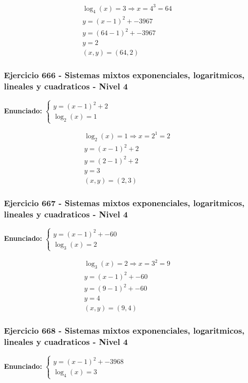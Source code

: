 \documentclass[12pt,a4paper]{article}
\begin{document}
\[
\begin{aligned}
\log_{4}\left(x\right)=3\Rightarrow x=4^{3}=64\\
y=(x-1)^2+-3967\\
y=(64-1)^2+-3967\\
y=2\\
\boxed{(x,y)=(64,2)}
\end{aligned}
\]


\subsubsection*{Ejercicio 666 - Sistemas mixtos exponenciales, logaritmicos, lineales y cuadraticos - Nivel 4}
\textbf{Enunciado:} \(\begin{cases} y=(x-1)^2+2\\ \log_{2}\left(x\right)=1\end{cases}\)

\[
\begin{aligned}
\log_{2}\left(x\right)=1\Rightarrow x=2^{1}=2\\
y=(x-1)^2+2\\
y=(2-1)^2+2\\
y=3\\
\boxed{(x,y)=(2,3)}
\end{aligned}
\]


\subsubsection*{Ejercicio 667 - Sistemas mixtos exponenciales, logaritmicos, lineales y cuadraticos - Nivel 4}
\textbf{Enunciado:} \(\begin{cases} y=(x-1)^2+-60\\ \log_{3}\left(x\right)=2\end{cases}\)

\[
\begin{aligned}
\log_{3}\left(x\right)=2\Rightarrow x=3^{2}=9\\
y=(x-1)^2+-60\\
y=(9-1)^2+-60\\
y=4\\
\boxed{(x,y)=(9,4)}
\end{aligned}
\]


\subsubsection*{Ejercicio 668 - Sistemas mixtos exponenciales, logaritmicos, lineales y cuadraticos - Nivel 4}
\textbf{Enunciado:} \(\begin{cases} y=(x-1)^2+-3968\\ \log_{4}\left(x\right)=3\end{cases}\)
\end{document}
